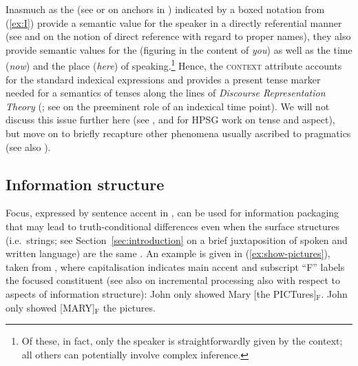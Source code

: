 \documentclass[output=paper
 	        ,biblatex
                ,babelshorthands
                ,newtxmath
                ,draftmode
                ,colorlinks, citecolor=brown
]{langscibook}
\begin{document}
Inasmuch as the   (see \citealt[--73]{Barwise:Perry:1983} or \citealt[--63]{Devlin:1991} on anchors in ) indicated by a boxed notation from (\ref{ex:I}) provide a semantic value for the speaker in a directly referential  manner (see \citealt{Marcus:1961} and \citealt{Kripke:1980} on the notion of direct reference with regard to  proper names), they also provide semantic values for the  (figuring in the content of \textit{you}) as well as the time (\textit{now}) and the place (\textit{here}) of speaking.\footnote{Of these, in fact, only the speaker is straightforwardly given by the context; all others can potentially involve complex inference.}
%
Hence, the \textsc{context} attribute accounts for the standard indexical expressions and provides a present tense marker needed for a semantics of tenses  along the lines of \emph{Discourse Representation Theory}  (\citealt{Kamp:Reyle:1993}; see \citealt{partee1973some} on the preeminent role of an indexical time point).
%
We will not discuss this issue further here (see \citealt{Van-Eynde:1998,Van-Eynde:2000}, \citealt{Bonami:2002} and \citealt{Costa:Branco:2012} for HPSG work on tense and aspect), but move on to briefly recapture other phenomena usually ascribed to pragmatics (see also \citealt[Section 5.2]{Kathol:Przepiorkowski:Tseng:2011}).
 




  
\subsection{Information structure}
\label{sec:information-structure}

Focus, expressed by sentence accent in , can be used for information packaging that may lead to truth-conditional differences  even when the surface structures (i.e.\ strings; see Section~\ref{sec:introduction} on a brief juxtaposition of spoken and written language) are the same \citep{Halliday:1967}.
%
An example is given in (\ref{ex:show-pictures}), taken from \citet[]{Krifka:2008}, where capitalisation indicates main accent and subscript \enquote{F} labels the focused constituent (see also  on incremental processing also with respect to aspects of information structure):
%
\ea \label{ex:show-pictures}
  \ea John only showed Mary [the PICTures]$_\text{F}$.
  \ex John only showed [MARY]$_\text{F}$ the pictures.
  \z
\z
\end{document}
